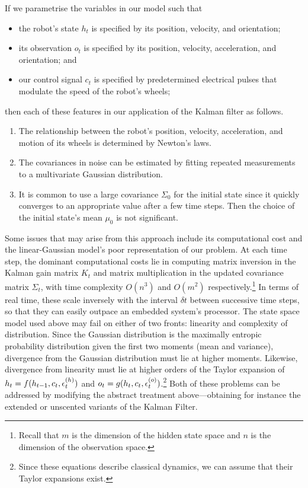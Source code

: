         If we parametrise the variables in our model such that
        \begin{itemize}
            \item the robot's state $h_t$ is specified by its position, velocity, and orientation;
            \item its observation $o_t$ is specified by its position, velocity, acceleration, and orientation; and
            \item our control signal $c_t$ is specified by predetermined electrical pulses that modulate the speed of the robot's wheels;
        \end{itemize}
        then each of these features in our application of the Kalman filter as follows.
        \begin{enumerate}
            \item The relationship between the robot's position, velocity, acceleration, and motion of its wheels is determined by Newton's laws.
            \item The covariances in noise can be estimated by fitting repeated measurements to a multivariate Gaussian distribution.
            \item It is common to use a large covariance $\Sigma_0$ for the initial state since it quickly converges to an appropriate value after a few time steps.
                Then the choice of the initial state's mean $\mu_0$ is not significant.\cite{murphy}
        \end{enumerate}

        Some issues that may arise from this approach include its computational cost and the linear-Gaussian model's poor representation of our problem.
        At each time step, the dominant computational costs lie in computing matrix inversion in the Kalman gain matrix $K_t$ and matrix multiplication in the updated covariance matrix $\Sigma_t$, with time complexity $O(n^3)$ and $O(m^2)$ respectively.\footnote{Recall that $m$ is the dimension of the hidden state space and $n$ is the dimension of the observation space.}
        In terms of real time, these scale inversely with the interval $\delta t$ between successive time steps, so that they can easily outpace an embedded system's processor.
        The state space model used above may fail on either of two fronts: linearity and complexity of distribution.
        Since the Gaussian distribution is the maximally entropic probability distribution given the first two moments (mean and variance), divergence from the Gaussian distribution must lie at higher moments.
        Likewise, divergence from linearity must lie at higher orders of the Taylor expansion of $h_t = f(h_{t-1}, c_t, \epsilon^{(h)}_t)$ and $o_t = g(h_{t}, c_t, \epsilon^{(o)}_t)$.\footnote{Since these equations describe classical dynamics, we can assume that their Taylor expansions exist.}
        Both of these problems can be addressed by modifying the abstract treatment above---obtaining for instance the extended or unscented variants of the Kalman Filter.


